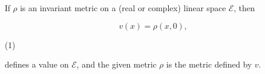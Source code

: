 If $\rho$ is an invariant metric on a (real or complex) linear space $\mathcal{E}$, then

$$v(x) = \rho(x, 0),$$

(1)

defines a value on $\mathcal{E}$, and the given metric $\rho$ is the metric defined by $v$.
